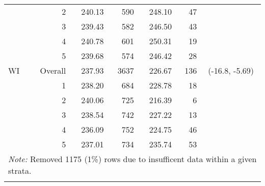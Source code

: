 \begin{longtable}{lrrr@{\extracolsep{.25cm}}rrc}
   & 2 & 240.13 & 590 & 248.10 &  47 &  \\ 
   & 3 & 239.43 & 582 & 246.50 &  43 &  \\ 
   & 4 & 240.78 & 601 & 250.31 &  19 &  \\ 
   & 5 & 239.68 & 574 & 246.42 &  28 &  \\ 
   \hline
WI & Overall & 237.93 & 3637 & 226.67 & 136 & (-16.8,  -5.69) \\ 
   & 1 & 238.20 & 684 & 228.78 &  18 &  \\ 
   & 2 & 240.06 & 725 & 216.39 &   6 &  \\ 
   & 3 & 238.54 & 742 & 227.22 &  13 &  \\ 
   & 4 & 236.09 & 752 & 224.75 &  46 &  \\ 
   & 5 & 237.01 & 734 & 235.74 &  53 &  \\ 
   \hline \multicolumn{7}{l}{\textit{Note:} Removed 1175 (1\%) rows due to insufficent data within a given strata.} \\\hline
\label{g4math-mlpsa-lr}
\end{longtable}
